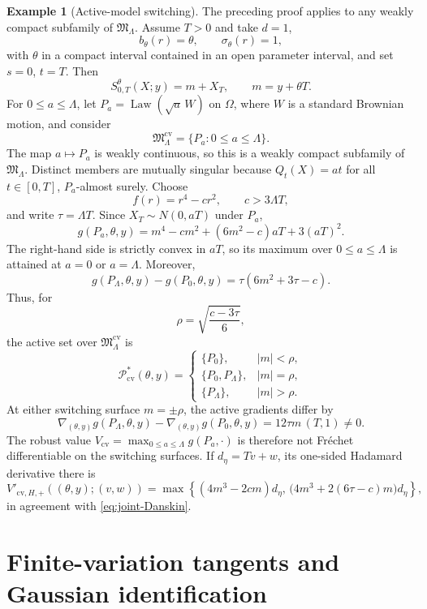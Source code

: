 \documentclass[11pt,reqno]{amsart}
\theoremstyle{plain}
\theoremstyle{definition}
\newtheorem{example}[example]{Example}
\newcommand{\cP}{\mathcal P}
\begin{document}
\begin{example}[Active-model switching]\label{ex:active-model-switch}
The preceding proof applies to any weakly compact subfamily of
\(\mathfrak M_\Lambda\).  Assume \(T>0\) and take \(d=1\),
\[
  b_\theta(r)=\theta,\qquad \sigma_\theta(r)=1,
\]
with \(\theta\) in a compact interval contained in an open parameter
interval, and set \(s=0\), \(t=T\).  Then
\[
  S_{0,T}^\theta(X;y)=m+X_T,
  \qquad m=y+\theta T.
\]
For \(0\le a\le\Lambda\), let
\(P_a=\operatorname{Law}(\sqrt a\,W)\) on \(\Omega\), where \(W\) is a
standard Brownian motion, and consider
\[
  \mathfrak M_\Lambda^{\mathrm{cv}}
  =\{P_a:0\le a\le\Lambda\}.
\]
The map \(a\mapsto P_a\) is weakly continuous, so this is a weakly compact
subfamily of \(\mathfrak M_\Lambda\).  Distinct members are mutually
singular because \(Q_t(X)=at\) for all \(t\in[0,T]\),
\(P_a\)-almost surely.  Choose
\[
  f(r)=r^4-cr^2,\qquad c>3\Lambda T,
\]
and write \(\tau=\Lambda T\).  Since
\(X_T\sim N(0,aT)\) under \(P_a\),
\[
  g(P_a,\theta,y)
  =m^4-cm^2+(6m^2-c)aT+3(aT)^2.
\]
The right-hand side is strictly convex in \(aT\), so its maximum over
\(0\le a\le\Lambda\) is attained at \(a=0\) or \(a=\Lambda\).  Moreover,
\[
  g(P_\Lambda,\theta,y)-g(P_0,\theta,y)
  =\tau(6m^2+3\tau-c).
\]
Thus, for
\[
  \rho=\sqrt{\frac{c-3\tau}{6}},
\]
the active set over \(\mathfrak M_\Lambda^{\mathrm{cv}}\) is
\[
  \cP_{\mathrm{cv}}^*(\theta,y)
  =
  \begin{cases}
    \{P_0\},& |m|<\rho,\\
    \{P_0,P_\Lambda\},& |m|=\rho,\\
    \{P_\Lambda\},& |m|>\rho.
  \end{cases}
\]
At either switching surface \(m=\pm\rho\), the active gradients differ by
\[
  \nabla_{(\theta,y)}g(P_\Lambda,\theta,y)
  -\nabla_{(\theta,y)}g(P_0,\theta,y)
  =12\tau m\,(T,1)\ne0.
\]
The robust value \(V_{\mathrm{cv}}=\max_{0\le a\le\Lambda}g(P_a,\cdot)\)
is therefore not Fr\'echet differentiable on the switching surfaces.  If
\(d_\eta=Tv+w\), its one-sided Hadamard derivative there is
\[
  V'_{\mathrm{cv},H,+}((\theta,y);(v,w))
  =
  \max\left\{
    (4m^3-2cm)d_\eta,\,
    \bigl(4m^3+2(6\tau-c)m\bigr)d_\eta
  \right\},
\]
in agreement with \eqref{eq:joint-Danskin}.
\end{example}

\section{Finite-variation tangents and Gaussian identification}
\label{sec:tangent}
\end{document}
